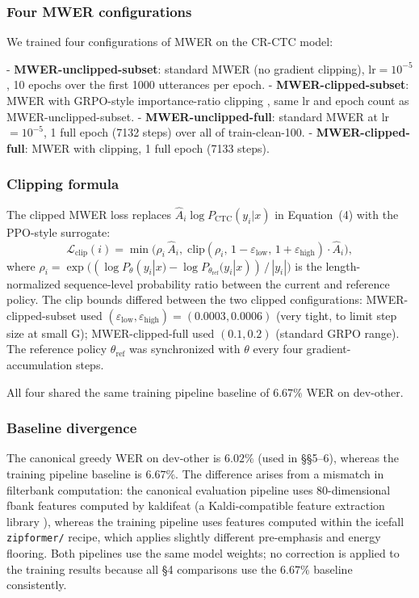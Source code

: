 \subsubsection{Four MWER configurations}

We trained four configurations of MWER on the CR-CTC model:

- \textbf{MWER-unclipped-subset}: standard MWER (no gradient clipping), lr$=10^{-5}$, 10 epochs over the first 1000 utterances per epoch.
- \textbf{MWER-clipped-subset}: MWER with GRPO-style importance-ratio clipping \cite{shao2024grpo}, same lr and epoch count as MWER-unclipped-subset.
- \textbf{MWER-unclipped-full}: standard MWER at lr$=10^{-5}$, 1 full epoch (7132 steps) over all of train-clean-100.
- \textbf{MWER-clipped-full}: MWER with clipping, 1 full epoch (7133 steps).

\subsubsection{Clipping formula}

The clipped MWER loss replaces $\hat{A}_i \log P_\text{CTC}(y_i|x)$ in Equation~(4) with the PPO-style surrogate:
\begin{equation*}
  \mathcal{L}_\text{clip}(i) = \min\!\bigl(\rho_i\,\hat{A}_i,\;\mathrm{clip}(\rho_i,\,1-\varepsilon_\text{low},\,1+\varepsilon_\text{high})\cdot\hat{A}_i\bigr), \tag{4a}
\end{equation*}
where $\rho_i = \exp\!\bigl((\log P_{\theta}(y_i|x) - \log P_{\theta_\text{ref}}(y_i|x))\,/\,|y_i|\bigr)$ is the length-normalized sequence-level probability ratio between the current and reference policy. The clip bounds differed between the two clipped configurations: MWER-clipped-subset used $(\varepsilon_\text{low}, \varepsilon_\text{high}) = (0.0003, 0.0006)$ (very tight, to limit step size at small G); MWER-clipped-full used $(0.1, 0.2)$ (standard GRPO range). The reference policy $\theta_\text{ref}$ was synchronized with $\theta$ every four gradient-accumulation steps.

All four shared the same training pipeline baseline of $6.67\%$ WER on dev-other.

\subsubsection{Baseline divergence}

The canonical greedy WER on dev-other is $6.02\%$ (used in §§5–6), whereas the training pipeline baseline is $6.67\%$. The difference arises from a mismatch in filterbank computation: the canonical evaluation pipeline uses 80-dimensional fbank features computed by kaldifeat (a Kaldi-compatible feature extraction library \cite{kaldifeat}), whereas the training pipeline uses features computed within the icefall \texttt{zipformer/} recipe, which applies slightly different pre-emphasis and energy flooring. Both pipelines use the same model weights; no correction is applied to the training results because all §4 comparisons use the $6.67\%$ baseline consistently.



